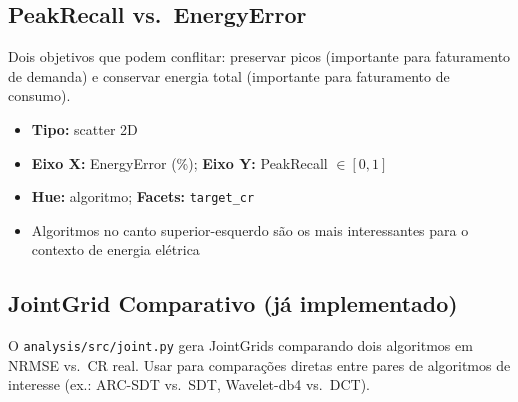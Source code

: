 \documentclass[12pt, a4paper]{article}
\begin{document}
\subsection{PeakRecall vs.\ EnergyError}

Dois objetivos que podem conflitar: preservar picos (importante para faturamento de demanda) e conservar energia total (importante para faturamento de consumo).

\begin{itemize}
    \item \textbf{Tipo:} scatter 2D
    \item \textbf{Eixo X:} EnergyError (\%); \textbf{Eixo Y:} PeakRecall $\in [0, 1]$
    \item \textbf{Hue:} algoritmo; \textbf{Facets:} \texttt{target\_cr}
    \item Algoritmos no canto superior-esquerdo são os mais interessantes para o contexto de energia elétrica
\end{itemize}

\subsection{JointGrid Comparativo (já implementado)}

O \texttt{analysis/src/joint.py} gera JointGrids comparando dois algoritmos em NRMSE vs.\ CR real. Usar para comparações diretas entre pares de algoritmos de interesse (ex.: ARC-SDT vs.\ SDT, Wavelet-db4 vs.\ DCT).



\end{document}
